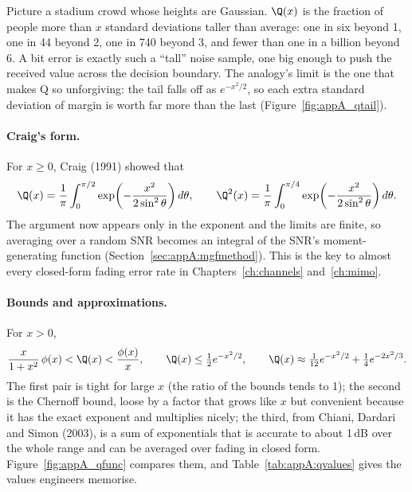 \begin{analogy}
Picture a stadium crowd whose heights are Gaussian. $\Q(x)$ is the fraction of people more than
$x$ standard deviations taller than average: one in six beyond 1, one in 44 beyond 2, one in 740
beyond 3, and fewer than one in a billion beyond 6. A bit error is exactly such a ``tall'' noise
sample, one big enough to push the received value across the decision boundary. The analogy's
limit is the one that makes Q so unforgiving: the tail falls off as $e^{-x^2/2}$, so each extra
standard deviation of margin is worth far more than the last (Figure~\ref{fig:appA_qtail}).
\end{analogy}

\paragraph{Craig's form.} For $x\ge0$, Craig (1991) showed that
\begin{equation}
\Q(x)=\frac1\pi\int_0^{\pi/2}\exp\!\left(-\frac{x^2}{2\sin^2\theta}\right)d\theta,\qquad
\Q^2(x)=\frac1\pi\int_0^{\pi/4}\exp\!\left(-\frac{x^2}{2\sin^2\theta}\right)d\theta.
\label{eq:appA:craig}
\end{equation}
The argument now appears only in the exponent and the limits are finite, so averaging over a
random SNR becomes an integral of the SNR's moment-generating function
(Section~\ref{sec:appA:mgfmethod}). This is the key to almost every closed-form fading error
rate in Chapters~\ref{ch:channels} and~\ref{ch:mimo}.

\paragraph{Bounds and approximations.} For $x>0$,
\begin{equation}
\frac{x}{1+x^2}\,\phi(x)<\Q(x)<\frac{\phi(x)}{x},\qquad
\Q(x)\le\tfrac12e^{-x^2/2},\qquad
\Q(x)\approx\tfrac1{12}e^{-x^2/2}+\tfrac14e^{-2x^2/3}.
\label{eq:appA:qbounds}
\end{equation}
The first pair is tight for large $x$ (the ratio of the bounds tends to 1); the second is the
Chernoff bound, loose by a factor that grows like $x$ but convenient because it has the exact
exponent and multiplies nicely; the third, from Chiani, Dardari and Simon (2003), is a sum of
exponentials that is accurate to about 1\,dB over the whole range and can be averaged over fading
in closed form. Figure~\ref{fig:appA_qfunc} compares them, and Table~\ref{tab:appA:qvalues}
gives the values engineers memorise.

